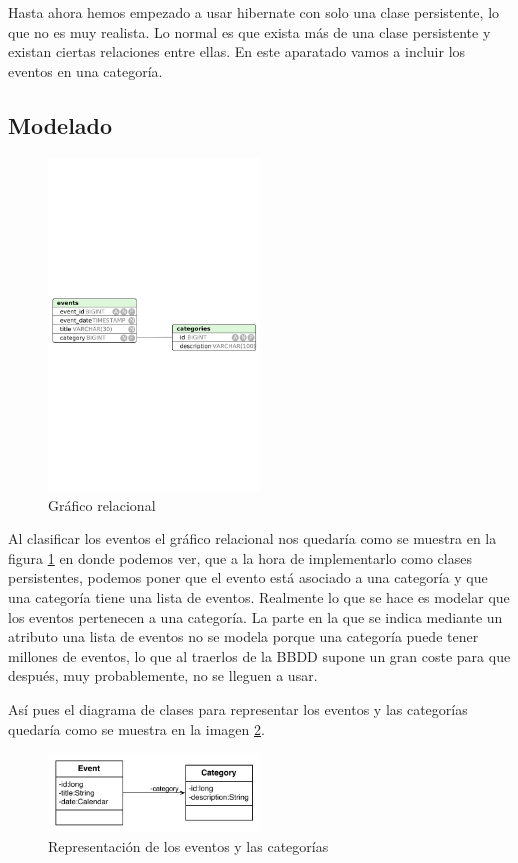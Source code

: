 \documentclass{article}
\begin{document}
	Hasta ahora hemos empezado a usar hibernate con solo una clase persistente, lo que no es muy realista. Lo normal es que exista más de una clase persistente y existan ciertas relaciones entre ellas. En este aparatado vamos a incluir los eventos en una categoría.

\subsection{Modelado}
\begin{figure}[h]
  \centering
    \includegraphics[width=0.5\textwidth]{commit04/img/ER.pdf}
  \caption{Gráfico relacional}
  \label{fig:c04:ER}
\end{figure}	

	Al clasificar los eventos el gráfico relacional nos quedaría como se muestra en la figura \ref{fig:c04:ER} en donde podemos ver, que a la hora de implementarlo como clases persistentes, podemos poner que el evento está asociado a una categoría y que una categoría tiene una lista de eventos. Realmente lo que se hace es modelar que los eventos pertenecen a una categoría. La parte en la que se indica mediante un atributo una lista de eventos no se modela porque una categoría puede tener millones de eventos, lo que al traerlos de la BBDD supone un gran coste para que después, muy probablemente, no se lleguen a usar.
	
	Así pues el diagrama de clases para representar los eventos y las categorías quedaría como se muestra en la imagen \ref{fig:c04:EventCategory}.

\begin{figure}[h]
  \centering
    \includegraphics[width=0.5\textwidth]{commit04/img/EventCategory.pdf}
  \caption{Representación de los eventos y las categorías}
  \label{fig:c04:EventCategory}
\end{figure}	
\end{document}
